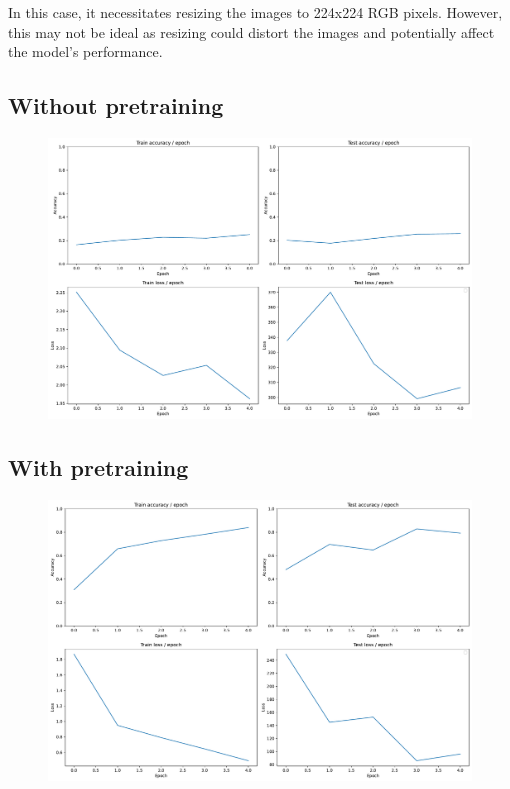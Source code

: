 In this case, it necessitates resizing the images to 224x224 RGB pixels. However, this may not be ideal as resizing could distort the images and potentially affect the model's performance.

\subsection{Without pretraining}
\begin{figure}[H]
    \centering
    \includegraphics*[width=\textwidth]{figs/Transformers/stats_vit.pdf}
    \caption{}
    \label{fig:}
\end{figure}


\subsection{With pretraining}

\begin{figure}[H]
    \centering
    \includegraphics*[width=\textwidth]{figs/Transformers/stats_vit_pretrained.pdf}
    \caption{}
    \label{fig:}
\end{figure}